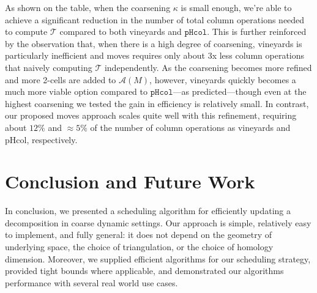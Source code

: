 \documentclass[sn-mathphys]{sn-jnl}
\begin{document}
As shown on the table, when the coarsening $\kappa$ is small enough, we're able to achieve a significant reduction in the number of total column operations needed to compute $\mathcal{T}$ compared to both vineyards and $\mathtt{pHcol}$. %
This is further reinforced by the observation that, when there is a high degree of coarsening, vineyards is particularly inefficient and moves requires only about 3x less column operations that naively computing $\mathcal{T}$ independently. As the coarsening becomes more refined and more 2-cells are added to $\mathcal{A}(M)$, however, vineyards quickly becomes a much more viable option compared to $\mathtt{pHcol}$---as predicted---though even at the highest coarsening we tested the gain in efficiency is relatively small. In contrast, our proposed moves approach scales quite well with this refinement, requiring about $12\%$  and $\approx 5\%$ of the number of column operations as vineyards and $\mathrm{pHcol}$, respectively. 






\section{Conclusion and Future Work}\label{sec:conclusion}
In conclusion, we presented a scheduling algorithm for efficiently updating a decomposition in coarse dynamic settings. Our approach is simple, relatively easy to implement, and fully general: it does not depend on the geometry of underlying space, the choice of triangulation, or the choice of homology dimension. Moreover, we supplied efficient algorithms for our scheduling strategy, provided tight bounds where applicable, and demonstrated our algorithms performance with several real world use cases.
\end{document}
